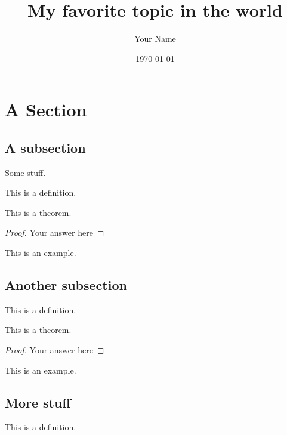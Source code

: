 \documentclass[boxes,sansserif]{seastaralgebras_expository}
\title{My favorite topic in the world}
\author{Your Name} %
\date{\today} %
\begin{document}
\maketitle


\section{A Section}

\subsection{A subsection}

Some stuff.

\begin{defn}
This is a definition.
\end{defn}

\begin{thm}
    This is a theorem.
\end{thm}
\begin{proof}
Your answer here
\end{proof}

\begin{example}
    This is an example.
\end{example}


\subsection{Another subsection}

\begin{defn}
This is a definition.
\end{defn}

\begin{thm}
    This is a theorem.
\end{thm}
\begin{proof}
Your answer here
\end{proof}

\begin{example}
    This is an example.
\end{example}


\subsection{More stuff}

\begin{defn}
This is a definition.
\end{defn}
\end{document}
